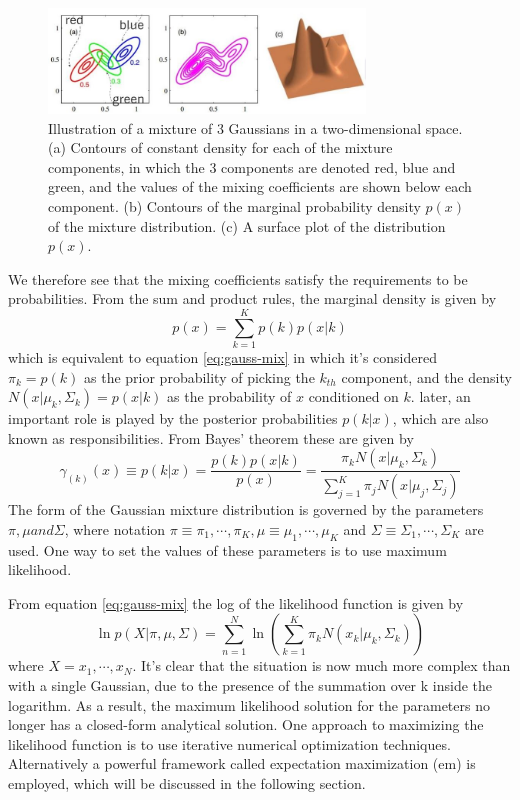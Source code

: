 \documentclass[12pt, a4paper, twoside]{report}
\begin{document}
\begin{figure}[!h]
	\centering
	\includegraphics[width=0.75\textwidth]
	{images/chapter4/gmm-illust-mix}
	\caption{Illustration of a mixture of 3 Gaussians in a two-dimensional space. (a) Contours of constant density for each of the mixture components, in which the 3 components are denoted red, blue and green, and the values of the mixing coefficients are shown below each component. (b) Contours of the marginal probability density $p(x)$ of the mixture distribution. (c) A surface plot of the distribution $p(x)$.}
	\label{fig:gmm-one-mixture}
\end{figure}

We therefore see that the mixing coefficients satisfy the requirements to be probabilities. From the sum and product rules, the marginal density is given by
\begin{equation}
p(x) = \sum_{k=1}^{K} p(k)p(x|k)
\end{equation}
which is equivalent to equation \ref{eq:gauss-mix} in which it's considered $\pi_k = p(k)$ as the prior probability of picking the $k_{th}$ component, and the density $N(x|\mu_k,\Sigma_k) = p(x|k)$ as the probability of $x$ conditioned on $k$. later, an important role is played by the posterior probabilities $p(k |x)$, which are also known as responsibilities. From Bayes' theorem these are given by
\begin{equation}
\gamma_{(k)}(x) \equiv p(k|x) = \frac{p(k)p(x|k)}{p(x)} = \frac{\pi_k N(x|\mu_k,\Sigma_k)}{\sum_{j=1}^{K} \pi_j N(x|\mu_j,\Sigma_j)}
\label{eq:gmm-bayes}
\end{equation}
The form of the Gaussian mixture distribution is governed by the parameters $\pi, \mu and \Sigma$, where notation $\pi \equiv {\pi_1, \cdots, \pi_K}, \mu \equiv {\mu_1, \cdots, \mu_K}$ and $\Sigma \equiv {\Sigma_1, \cdots, \Sigma_K}$ are used. One way to set the values of these parameters is to use maximum likelihood.

From equation \ref{eq:gauss-mix} the log of the likelihood function is given by
\begin{equation}
\ln p(X|\pi, \mu, \Sigma) = \sum_{n=1}^{N} \ln \left ( \sum_{k=1}^{K} \pi_k N(x_k|\mu_k,\Sigma_k) \right )
\label{eq:gmm-log-prob}
\end{equation}
where $X = {x_1, \cdots, x_N}$. It's clear that the situation is now much more complex than with a single Gaussian, due to the presence of the summation over k inside the logarithm. As a result, the maximum likelihood solution for the parameters no longer has a closed-form analytical solution. One approach to maximizing the likelihood function is to use iterative numerical optimization techniques. Alternatively a powerful framework called expectation maximization (\acrshort{em}) is employed, which will be discussed in the following section.
\end{document}
